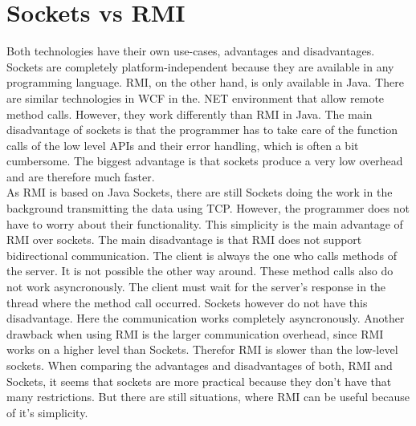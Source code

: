 \section{Sockets vs RMI}
Both technologies have their own use-cases, advantages and disadvantages. Sockets are completely platform-independent because they are available in any programming language. RMI, on the other hand, is only available in Java. There are similar technologies in WCF in the. NET environment that allow remote method calls. However, they work differently than RMI in Java. The main disadvantage of sockets is that the programmer has to take care of the function calls of the low level APIs and their error handling, which is often a bit cumbersome. The biggest advantage is that sockets produce a very low overhead and are therefore much faster.
\\
As RMI is based on Java Sockets, there are still Sockets doing the work in the background transmitting the data using TCP. However, the programmer does not have to worry about their functionality. This simplicity is the main advantage of RMI over sockets. The main disadvantage is that RMI does not support bidirectional communication. The client is always the one who calls methods of the server. It is not possible the other way around. These method calls also do not work asyncronously. The client must wait for the server's response in the thread where the method call occurred. Sockets however do not have this disadvantage. Here the communication works completely asyncronously. Another drawback when using RMI is the larger communication overhead, since RMI works on a higher level than Sockets. Therefor RMI is slower than the low-level sockets. When comparing the advantages and disadvantages of both, RMI and Sockets, it seems that sockets are more practical because they don't have that many restrictions. But there are still situations, where RMI can be useful because of it's simplicity.
